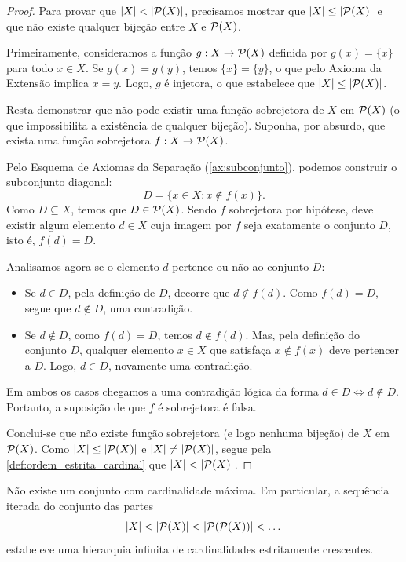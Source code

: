 \begin{proof}
    Para provar que \(|X| < |\mathcal{P}(X)|\), precisamos mostrar que \(|X| \leq |\mathcal{P}(X)|\) e que não existe qualquer bijeção entre \(X\) e \(\mathcal{P}(X)\).

    Primeiramente, consideramos a função \(g: X \to \mathcal{P}(X)\) definida por \(g(x) = \{x\}\) para todo \(x \in X\). Se \(g(x) = g(y)\), temos \(\{x\} = \{y\}\), o que pelo Axioma da Extensão implica \(x = y\). Logo, \(g\) é injetora, o que estabelece que \(|X| \leq |\mathcal{P}(X)|\).

    Resta demonstrar que não pode existir uma função sobrejetora de \(X\) em \(\mathcal{P}(X)\) (o que impossibilita a existência de qualquer bijeção). Suponha, por absurdo, que exista uma função sobrejetora \(f: X \to \mathcal{P}(X)\).

    Pelo Esquema de Axiomas da Separação (\autoref{ax:subconjunto}), podemos construir o subconjunto diagonal:
    \[
        D = \{x \in X : x \notin f(x)\}.
    \]
    Como \(D \subseteq X\), temos que \(D \in \mathcal{P}(X)\). Sendo \(f\) sobrejetora por hipótese, deve existir algum elemento \(d \in X\) cuja imagem por \(f\) seja exatamente o conjunto \(D\), isto é, \(f(d) = D\).

    Analisamos agora se o elemento \(d\) pertence ou não ao conjunto \(D\):
    \begin{itemize}
        \item Se \(d \in D\), pela definição de \(D\), decorre que \(d \notin f(d)\). Como \(f(d) = D\), segue que \(d \notin D\), uma contradição.
        \item Se \(d \notin D\), como \(f(d) = D\), temos \(d \notin f(d)\). Mas, pela definição do conjunto \(D\), qualquer elemento \(x \in X\) que satisfaça \(x \notin f(x)\) deve pertencer a \(D\). Logo, \(d \in D\), novamente uma contradição.
    \end{itemize}
    Em ambos os casos chegamos a uma contradição lógica da forma \(d \in D \iff d \notin D\). Portanto, a suposição de que \(f\) é sobrejetora é falsa.

    Conclui-se que não existe função sobrejetora (e logo nenhuma bijeção) de \(X\) em \(\mathcal{P}(X)\). Como \(|X| \leq |\mathcal{P}(X)|\) e \(|X| \neq |\mathcal{P}(X)|\), segue pela \autoref{def:ordem_estrita_cardinal} que \(|X| < |\mathcal{P}(X)|\).
\end{proof}

\begin{corolario}
    \label{cor:cadeia_infinita_cardinais}
    Não existe um conjunto com cardinalidade máxima. Em particular, a sequência iterada do conjunto das partes
    \[
        |X| < |\mathcal{P}(X)| < |\mathcal{P}(\mathcal{P}(X))| < \dots
    \]
    estabelece uma hierarquia infinita de cardinalidades estritamente crescentes.
\end{corolario}

